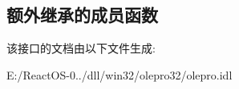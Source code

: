 \subsection*{额外继承的成员函数}


该接口的文档由以下文件生成\+:\begin{DoxyCompactItemize}
\item 
E\+:/\+React\+O\+S-\/0../dll/win32/olepro32/olepro.\+idl\end{DoxyCompactItemize}
